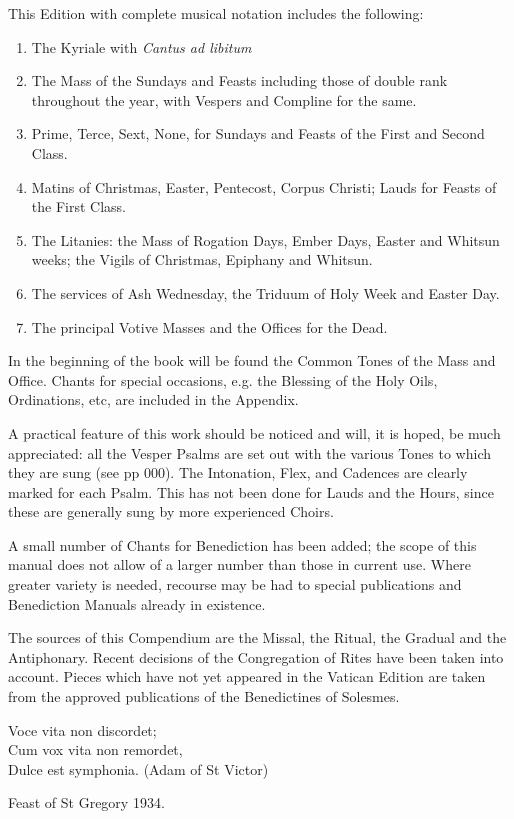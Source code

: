 This Edition with complete musical notation includes the following:
\begin{enumerate}
\item The Kyriale with {\it Cantus ad libitum}
\item The Mass of the Sundays and Feasts including those of double rank throughout the year, with Vespers and Compline for the same.
\item Prime, Terce, Sext, None, for Sundays and Feasts of the First and Second Class.
\item Matins of Christmas, Easter, Pentecost, Corpus Christi; Lauds for Feasts of the First Class.
\item The Litanies: the Mass of Rogation Days, Ember Days, Easter and Whitsun weeks; the Vigils of Christmas, Epiphany and Whitsun.
\item The services of Ash Wednesday, the Triduum of Holy Week and Easter Day.
\item The principal Votive Masses and the Offices for the Dead.
\end{enumerate}

In the beginning of the book will be found the Common Tones of the Mass and Office. Chants for special occasions, e.g. the Blessing of the Holy Oils, Ordinations, etc, are included in the Appendix.

A practical feature of this work should be noticed and will, it is hoped, be much appreciated: all the Vesper Psalms are set out with the various Tones to which they are sung (see pp 000). The Intonation, Flex, and Cadences are clearly marked for each Psalm. This has not been done for Lauds and the Hours, since these are generally sung by more experienced Choirs.

A small number of Chants for Benediction has been added; the scope of this manual does not allow of a larger number than those in current use. Where greater variety is needed, recourse may be had to special publications and Benediction Manuals already in existence.

The sources of this Compendium are the Missal, the Ritual, the Gradual and the Antiphonary. Recent decisions of the Congregation of Rites have been taken into account. Pieces which have not yet appeared in the Vatican Edition are taken from the approved publications of the Benedictines of Solesmes.

\begin{adjustwidth}{2cm}{}
Voce vita non discordet;\\
Cum vox vita non remordet,\\
Dulce est symphonia. (Adam of St Victor)
\end{adjustwidth}

Feast of St Gregory 1934.


